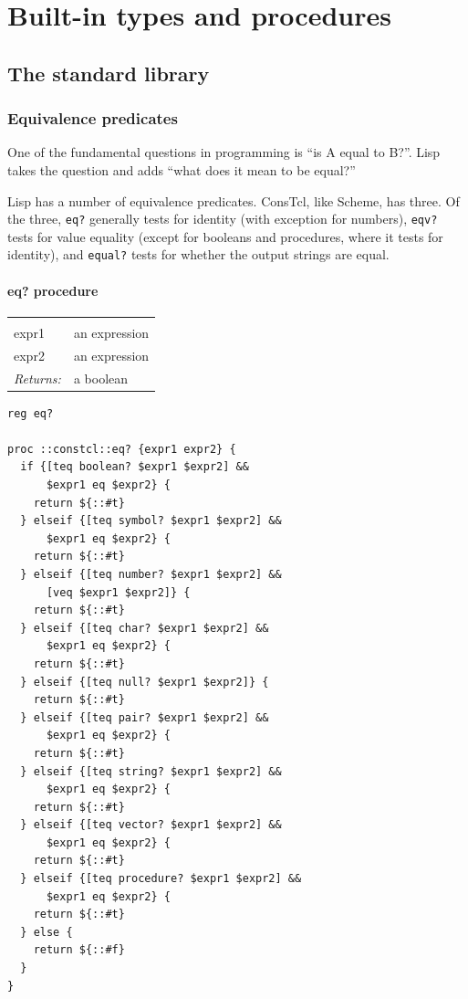 \documentclass[a5paper,draft]{memoir}
\begin{document}
\part{Built-in types and procedures}
\label{builtin-types-and-procedures}

\chapter{The standard library}
\label{the-standard-library}

\section{Equivalence predicates}
\label{equivalence-predicates}

One of the fundamental questions in programming is ``is A equal to B?''. Lisp takes the question and adds ``what does it mean to be equal?''

Lisp has a number of equivalence predicates. ConsTcl, like Scheme, has three. Of the three, \texttt{eq?} generally tests for identity (with exception for numbers), \texttt{eqv?} tests for value equality (except for booleans and procedures, where it tests for identity), and \texttt{equal?} tests for whether the output strings are equal.

\subsection{eq? procedure}
\label{eq-procedure}

\noindent\begin{tabular}{ |p{1.9cm} p{6.5cm}| }
\hline
\rowcolor[HTML]{CCCCCC} \multicolumn{2}{|l|}{\textbf{eq?, eqv?, equal? (public)}} \\
expr1 & an expression \\
expr2 & an expression \\
\textit{Returns:} & a boolean \\
\hline
\end{tabular}

\begin{lstlisting}
reg eq?

proc ::constcl::eq? {expr1 expr2} {
  if {[teq boolean? $expr1 $expr2] &&
      $expr1 eq $expr2} {
    return ${::#t}
  } elseif {[teq symbol? $expr1 $expr2] &&
      $expr1 eq $expr2} {
    return ${::#t}
  } elseif {[teq number? $expr1 $expr2] &&
      [veq $expr1 $expr2]} {
    return ${::#t}
  } elseif {[teq char? $expr1 $expr2] &&
      $expr1 eq $expr2} {
    return ${::#t}
  } elseif {[teq null? $expr1 $expr2]} {
    return ${::#t}
  } elseif {[teq pair? $expr1 $expr2] &&
      $expr1 eq $expr2} {
    return ${::#t}
  } elseif {[teq string? $expr1 $expr2] &&
      $expr1 eq $expr2} {
    return ${::#t}
  } elseif {[teq vector? $expr1 $expr2] &&
      $expr1 eq $expr2} {
    return ${::#t}
  } elseif {[teq procedure? $expr1 $expr2] &&
      $expr1 eq $expr2} {
    return ${::#t}
  } else {
    return ${::#f}
  }
}
\end{lstlisting}
\end{document}
